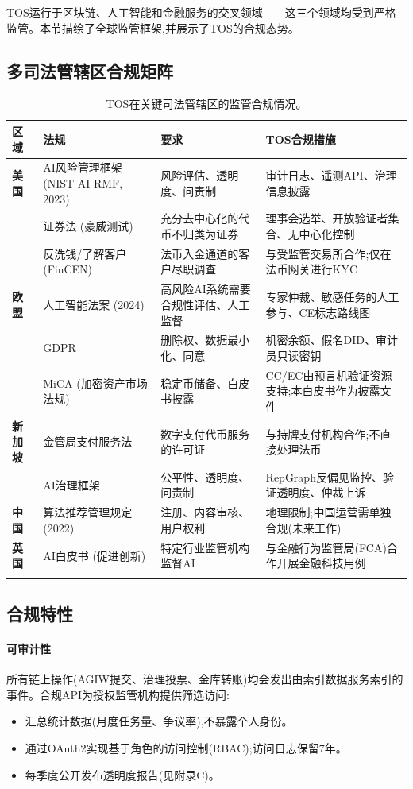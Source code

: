 \documentclass[11pt]{article}
\begin{document}
TOS运行于区块链、人工智能和金融服务的交叉领域——这三个领域均受到严格监管。本节描绘了全球监管框架,并展示了TOS的合规态势。

\subsection{多司法管辖区合规矩阵}

\begin{longtable}{@{}p{}p{}p{}p{}@{}}
\toprule
\textbf{区域} & \textbf{法规} & \textbf{要求} & \textbf{TOS合规措施} \\\midrule
\textbf{美国} & AI风险管理框架 (NIST AI RMF, 2023) & 风险评估、透明度、问责制 & 审计日志、遥测API、治理信息披露 \\
 & 证券法 (豪威测试) & 充分去中心化的代币不归类为证券 & 理事会选举、开放验证者集合、无中心化控制 \\
 & 反洗钱/了解客户 (FinCEN) & 法币入金通道的客户尽职调查 & 与受监管交易所合作;仅在法币网关进行KYC \\
\textbf{欧盟} & 人工智能法案 (2024) & 高风险AI系统需要合规性评估、人工监督 & 专家仲裁、敏感任务的人工参与、CE标志路线图 \\
 & GDPR & 删除权、数据最小化、同意 & 机密余额、假名DID、审计员只读密钥 \\
 & MiCA (加密资产市场法规) & 稳定币储备、白皮书披露 & CC/EC由预言机验证资源支持;本白皮书作为披露文件 \\
\textbf{新加坡} & 金管局支付服务法 & 数字支付代币服务的许可证 & 与持牌支付机构合作;不直接处理法币 \\
 & AI治理框架 & 公平性、透明度、问责制 & RepGraph反偏见监控、验证透明度、仲裁上诉 \\
\textbf{中国} & 算法推荐管理规定 (2022) & 注册、内容审核、用户权利 & 地理限制;中国运营需单独合规(未来工作) \\
\textbf{英国} & AI白皮书 (促进创新) & 特定行业监管机构监督AI & 与金融行为监管局(FCA)合作开展金融科技用例 \\
\bottomrule
\caption{TOS在关键司法管辖区的监管合规情况。}
\end{longtable}

\subsection{合规特性}

\paragraph{可审计性}
所有链上操作(AGIW提交、治理投票、金库转账)均会发出由索引数据服务索引的事件。合规API为授权监管机构提供筛选访问:
\begin{itemize}[noitemsep]
  \item 汇总统计数据(月度任务量、争议率),不暴露个人身份。
  \item 通过OAuth2实现基于角色的访问控制(RBAC);访问日志保留7年。
  \item 每季度公开发布透明度报告(见附录C)。
\end{itemize}
\end{document}
